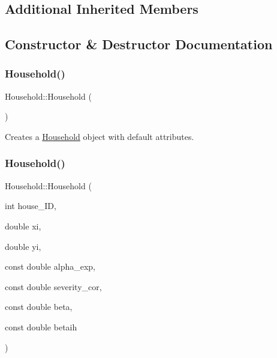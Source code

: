 \subsection*{Additional Inherited Members}


\subsection{Constructor \& Destructor Documentation}
\mbox{\label{classHousehold_a806512a49b82de676b263b47c7717391}} 
\subsubsection{\texorpdfstring{Household()}{Household()}\hspace{0.1cm}{\footnotesize\ttfamily [1/2]}}
{\footnotesize\ttfamily Household\+::\+Household (\begin{DoxyParamCaption}{ }\end{DoxyParamCaption})\hspace{0.3cm}{\ttfamily [default]}}



Creates a \hyperlink{classHousehold}{Household} object with default attributes. 

\mbox{\label{classHousehold_a0f96ac02e6cb0ecc7fd7a291af93c05e}} 
\subsubsection{\texorpdfstring{Household()}{Household()}\hspace{0.1cm}{\footnotesize\ttfamily [2/2]}}
{\footnotesize\ttfamily Household\+::\+Household (\begin{DoxyParamCaption}\item[{int}]{house\+\_\+\+ID,  }\item[{double}]{xi,  }\item[{double}]{yi,  }\item[{const double}]{alpha\+\_\+exp,  }\item[{const double}]{severity\+\_\+cor,  }\item[{const double}]{beta,  }\item[{const double}]{betaih }\end{DoxyParamCaption})\hspace{0.3cm}{\ttfamily [inline]}}



